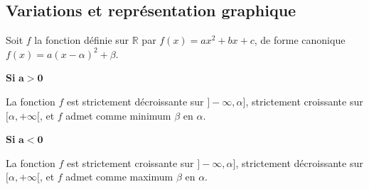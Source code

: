 \documentclass[11pt]{article}
\begin{document}
\subsection{Variations et représentation graphique}
\begin{prop}
  Soit $f$ la fonction définie sur $\mathbb{R}$ par $f(x)=ax^2+bx+c$, de forme
  canonique $f(x)=a(x-\alpha)^2+\beta$.

  \noindent
  \begin{minipage}[t]{.47\textwidth}
    \begin{center}
      {\bf Si} $\mathbf{a>0}$\vspace{.2cm}

    \end{center}
  La fonction $f$ est strictement décroissante sur $]-\infty, \alpha]$,
  strictement croissante sur $[\alpha, +\infty[$, et $f$ admet comme minimum
    $\beta$ en $\alpha$.
    \begin{center}
    \end{center}
  \end{minipage}
    \hfill
  \begin{minipage}[t]{.47\textwidth}
    \begin{center}
      {\bf Si} $\mathbf{a<0}$\vspace{.2cm}

    \end{center}
  La fonction $f$ est strictement croissante sur $]-\infty, \alpha]$,
  strictement décroissante sur $[\alpha, +\infty[$, et $f$ admet comme maximum
    $\beta$ en $\alpha$.
    \begin{center}
    \end{center}
  \end{minipage}
\end{prop}
\end{document}
